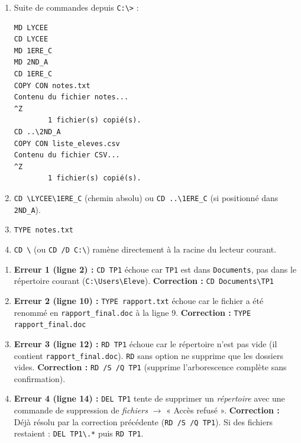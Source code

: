 \documentclass[11pt]{article}
\begin{document}
\begin{corrige}
\begin{enumerate}
    \item Suite de commandes depuis \texttt{C:\textbackslash>} :
\begin{lstlisting}
MD LYCEE
CD LYCEE
MD 1ERE_C
MD 2ND_A
CD 1ERE_C
COPY CON notes.txt
Contenu du fichier notes...
^Z
        1 fichier(s) copié(s).
CD ..\2ND_A
COPY CON liste_eleves.csv
Contenu du fichier CSV...
^Z
        1 fichier(s) copié(s).
\end{lstlisting}
    \item \texttt{CD \textbackslash LYCEE\textbackslash 1ERE\_C} (chemin absolu) ou \texttt{CD ..\textbackslash 1ERE\_C} (si positionné dans \texttt{2ND\_A}).
    \item \texttt{TYPE notes.txt}
    \item \texttt{CD \textbackslash} (ou \texttt{CD /D C:\textbackslash}) ramène directement à la racine du lecteur courant.
\end{enumerate}
\end{corrige}

\begin{corrige}
\begin{enumerate}
    \item \textbf{Erreur 1 (ligne 2) :} \texttt{CD TP1} échoue car \texttt{TP1} est dans \texttt{Documents}, pas dans le répertoire courant (\texttt{C:\textbackslash Users\textbackslash Eleve}).
    \textbf{Correction :} \texttt{CD Documents\textbackslash TP1}
    
    \item \textbf{Erreur 2 (ligne 10) :} \texttt{TYPE rapport.txt} échoue car le fichier a été renommé en \texttt{rapport\_final.doc} à la ligne 9.
    \textbf{Correction :} \texttt{TYPE rapport\_final.doc}
    
    \item \textbf{Erreur 3 (ligne 12) :} \texttt{RD TP1} échoue car le répertoire n'est pas vide (il contient \texttt{rapport\_final.doc}). \texttt{RD} sans option ne supprime que les dossiers vides.
    \textbf{Correction :} \texttt{RD /S /Q TP1} (supprime l'arborescence complète sans confirmation).
    
    \item \textbf{Erreur 4 (ligne 14) :} \texttt{DEL TP1} tente de supprimer un \emph{répertoire} avec une commande de suppression de \emph{fichiers} $\rightarrow$ « Accès refusé ».
    \textbf{Correction :} Déjà résolu par la correction précédente (\texttt{RD /S /Q TP1}). Si des fichiers restaient : \texttt{DEL TP1\textbackslash *.*} puis \texttt{RD TP1}.
\end{enumerate}
\end{corrige}
\end{document}
